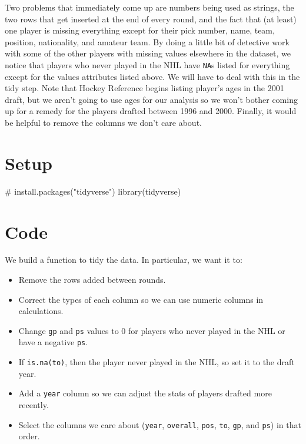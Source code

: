 \documentclass[
  letterpaper,
  DIV=11,
  numbers=noendperiod]{scrreprt}
\newenvironment{Shaded}{\begin{snugshade}}{\end{snugshade}}
\newcommand{\CommentTok}[1]{\textcolor[rgb]{0.37,0.37,0.37}{#1}}
\newcommand{\FunctionTok}[1]{\textcolor[rgb]{0.28,0.35,0.67}{#1}}
\newcommand{\NormalTok}[1]{\textcolor[rgb]{0.00,0.23,0.31}{#1}}
\begin{document}
Two problems that immediately come up are numbers being used as strings,
the two rows that get inserted at the end of every round, and the fact
that (at least) one player is missing everything except for their pick
number, name, team, position, nationality, and amateur team. By doing a
little bit of detective work with some of the other players with missing
values elsewhere in the dataset, we notice that players who never played
in the NHL have \texttt{NA}s listed for everything except for the values
attributes listed above. We will have to deal with this in the tidy
step. Note that Hockey Reference begins listing player's ages in the
2001 draft, but we aren't going to use ages for our analysis so we won't
bother coming up for a remedy for the players drafted between 1996 and
2000. Finally, it would be helpful to remove the columns we don't care
about.

\section{Setup}\label{setup-1}

\begin{Shaded}
\begin{Highlighting}[]
\CommentTok{\# install.packages("tidyverse")}
\FunctionTok{library}\NormalTok{(tidyverse)}
\end{Highlighting}
\end{Shaded}

\section{Code}\label{code-1}

We build a function to tidy the data. In particular, we want it to:

\begin{itemize}
\item
  Remove the rows added between rounds.
\item
  Correct the types of each column so we can use numeric columns in
  calculations.
\item
  Change \texttt{gp} and \texttt{ps} values to 0 for players who never
  played in the NHL or have a negative \texttt{ps}.
\item
  If \texttt{is.na(to)}, then the player never played in the NHL, so set
  it to the draft year.
\item
  Add a \texttt{year} column so we can adjust the stats of players
  drafted more recently.
\item
  Select the columns we care about (\texttt{year}, \texttt{overall},
  \texttt{pos}, \texttt{to}, \texttt{gp}, and \texttt{ps}) in that
  order.
\end{itemize}
\end{document}

